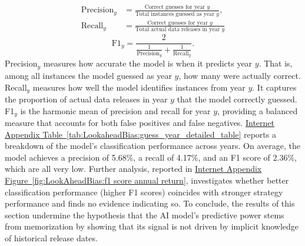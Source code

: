 \documentclass[12pt,oneside,letter]{article}
\newcommand*{\mytabIA}[1]{\hyperref[{#1}]{Internet Appendix Table~\ref*{#1}}}
\newcommand*{\myfigIA}[1]{\hyperref[{#1}]{Internet Appendix Figure~\ref*{#1}}}
\begin{document}
		 \begin{align}
		 	\text{Precision}_y 
		 	&= \frac{\text{Correct guesses for year } y}{\text{Total instances guessed as year } y},\\[6pt]
		 	\text{Recall}_y 
		 	&= \frac{\text{Correct guesses for year } y}{\text{Total actual data releases in year } y}
		 \end{align}
		 \vspace{-25pt}
		 \begin{equation}
		 	\text{F1}_y 
		 	= \frac{2}{\frac{1}{\text{Precision}_y} + \frac{1}{\text{Recall}_y}}.
		 	\label{eq:Lookahead:definition of f1 score}
		 \end{equation}
		 Precision\(_y\) measures how accurate the model is when it predicts year \(y\). That is, among all instances the model guessed as year \(y\), how many were actually correct. Recall\(_y\) measures how well the model identifies instances from year \(y\). It captures the proportion of actual data releases in year \(y\) that the model correctly guessed. F1\(_y\) is the harmonic mean of precision and recall for year \(y\), providing a balanced measure that accounts for both false positives and false negatives. \mytabIA{tab:LookaheadBias:guess_year_detailed_table} reports a breakdown of the model’s classification performance across years. On average, the model achieves a precision of 5.68\%, a recall of 4.17\%, and an F1 score of 2.36\%, which are all very low. Further analysis, reported in \myfigIA{fig:LookAheadBias:f1 score annual return}, investigates whether better classification performance (higher F1 scores) coincides with stronger strategy performance and finds no evidence indicating so. To conclude, the results of this section undermine the hypothesis that the AI model’s predictive power stems from memorization by showing that its signal is not driven by implicit knowledge of historical release dates.
\end{document}
